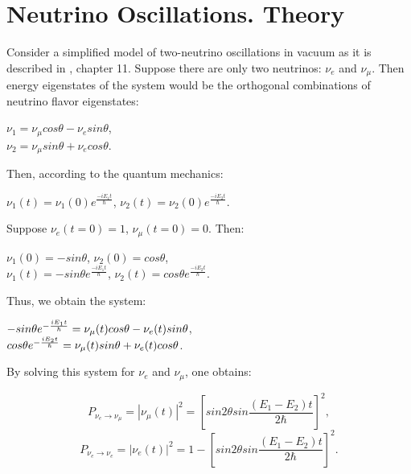 \section{Neutrino Oscillations. Theory}


Consider a simplified model of two-neutrino oscillations in vacuum as it is described in \cite{ref_Griffiths}, chapter 11. Suppose there are only two neutrinos: $\nu_e$ and $\nu_{\mu}$. Then energy eigenstates of the system would be the orthogonal combinations of neutrino flavor eigenstates:\\ 
\begin{center}
$\nu_1=\nu_{\mu}cos\theta-\nu_esin\theta$,\\ 
$\nu_2=\nu_{\mu}sin\theta+\nu_ecos\theta$.\\ 
\end{center}
Then, according to the quantum mechanics:\\ 
\begin{center}
$\nu_1(t)=\nu_1(0)e^{\frac{-iE_1t}{\hbar}}$, $\nu_2(t)=\nu_2(0)e^{\frac{-iE_2t}{\hbar}}$.\\ 
\end{center}
Suppose $\nu_e(t=0)=1$, $\nu_\mu(t=0)=0$. Then:\\ 
\begin{center}
$\nu_1(0)=-sin\theta$, $\nu_2(0)=cos\theta$,\\
$\nu_1(t)=-{sin\theta}e^{\frac{-iE_1t}{\hbar}}$, $\nu_2(t)={cos\theta}e^{\frac{-iE_2t}{\hbar}}$.\\ 
\end{center}
Thus, we obtain the system:\\ 
\begin{center}
$-{sin\theta}e^{-{{iE_1t} \over \hbar}}=\nu_\mu(t)cos\theta-\nu_e(t)sin\theta$,\\
${cos\theta}e^{-{{iE_2t} \over \hbar}}=\nu_\mu(t)sin\theta+\nu_e(t)cos\theta$.\\ 
\end{center}
By solving this system for $\nu_e$ and $\nu_\mu$, one obtains:\\ 
\begin{center}
\begin{equation}
\label{eq:P_twoNu1}
P_{\nu_e \rightarrow \nu_\mu} = |\nu_\mu(t)|^2=[{sin2\theta}sin{\frac{(E_1-E_2)t}{2\hbar}}]^2,
\end{equation}
\begin{equation}
\label{eq:P_twoNu2}
P_{\nu_e \rightarrow \nu_e}=|\nu_e(t)|^2=1-[{sin2\theta}sin{\frac{(E_1-E_2)t}{2\hbar}}]^2.
\end{equation}
\end{center}
